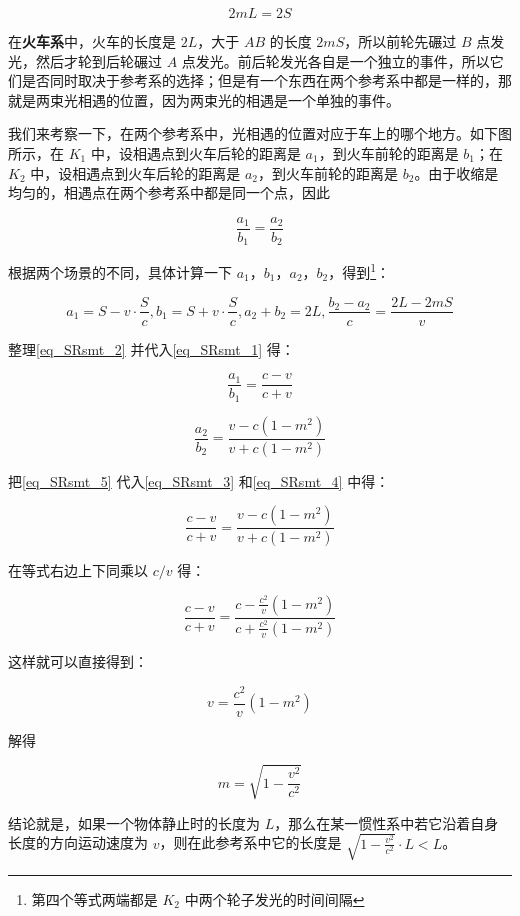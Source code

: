 \begin{equation}\label{eq_SRsmt_1}
2mL=2S
\end{equation}

在\textbf{火车系}中，火车的长度是 $2L$，大于 $AB$ 的长度 $2mS$，所以前轮先碾过 $B$ 点发光，然后才轮到后轮碾过 $A$ 点发光。前后轮发光各自是一个独立的事件，所以它们是否同时取决于参考系的选择；但是有一个东西在两个参考系中都是一样的，那就是两束光相遇的位置，因为两束光的相遇是一个单独的事件。

我们来考察一下，在两个参考系中，光相遇的位置对应于车上的哪个地方。如下图所示，在 $K_1$ 中，设相遇点到火车后轮的距离是 $a_1$，到火车前轮的距离是 $b_1$；在 $K_2$ 中，设相遇点到火车后轮的距离是 $a_2$，到火车前轮的距离是 $b_2$。由于收缩是均匀的，相遇点在两个参考系中都是同一个点，因此

\begin{equation}\label{eq_SRsmt_5}
\frac{a_1}{b_1}=\frac{a_2}{b_2}
\end{equation}

根据两个场景的不同，具体计算一下 $a_1$，$b_1$，$a_2$，$b_2$，得到\footnote{第四个等式两端都是 $K_2$ 中两个轮子发光的时间间隔}：

\begin{equation}\label{eq_SRsmt_2}
a_1=S-v\cdot\frac{S}{c},b_1=S+v\cdot\frac{S}{c},a_2+b_2=2L,\frac{b_2-a_2}{c}=\frac{2L-2mS}{v}
\end{equation}

整理\autoref{eq_SRsmt_2} 并代入\autoref{eq_SRsmt_1} 得：

\begin{equation}\label{eq_SRsmt_3}
\frac{a_1}{b_1}=\frac{c-v}{c+v}
\end{equation}

\begin{equation}\label{eq_SRsmt_4}
\frac{a_2}{b_2}=\frac{v-c(1-m^2)}{v+c(1-m^2)}
\end{equation}

把\autoref{eq_SRsmt_5} 代入\autoref{eq_SRsmt_3} 和\autoref{eq_SRsmt_4} 中得：

\begin{equation}
\frac{c-v}{c+v}=\frac{v-c(1-m^2)}{v+c(1-m^2)}
\end{equation}

在等式右边上下同乘以 $c/v$ 得：

\begin{equation}
\frac{c-v}{c+v}=\frac{c-\frac{c^2}{v}(1-m^2)}{c+\frac{c^2}{v}(1-m^2)}
\end{equation}

这样就可以直接得到：

\begin{equation}
v=\frac{c^2}{v}(1-m^2)
\end{equation}

解得

\begin{equation}
m=\sqrt{1-\frac{v^2}{c^2}}
\end{equation}

结论就是，如果一个物体静止时的长度为 $L$，那么在某一惯性系中若它沿着自身长度的方向运动速度为 $v$，则在此参考系中它的长度是 $\sqrt{1-\frac{v^2}{c^2}}\cdot L<L$。






